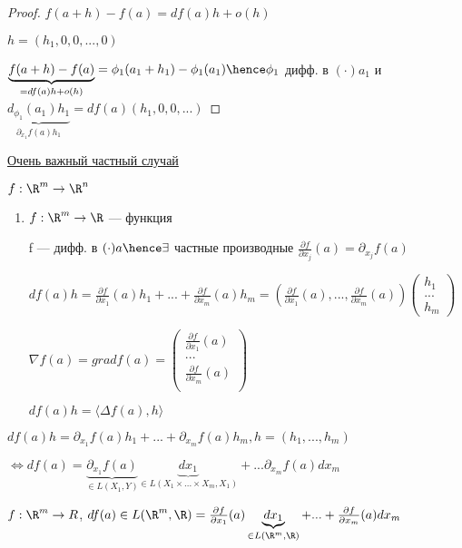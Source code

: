 \begin{proof}
    $f(a + h) - f(a) = df(a)h + o(h)$ 

    $h = (h_1, 0, 0, ..., 0)$

    $\underbrace{f(a + h) - f(a)}_{ = df(a)h + o(h)} = \phi_1(a_1 + h_1) - \phi_1(a_1) \hence \phi_1$ дифф. в $(\cdot) a_1$ и 
    $\underbrace{d_{\phi_1}(a_1)h_1}_{\partial_{x_1} f(a)h_1} = df(a)(h_1, 0, 0, ...)$  
\end{proof}

\underline{Очень важный частный случай}

$f : \R ^ m \to \R^n$

\begin{enumerate}
    

    \item $f : \R ^ m \to \R$ --- функция
    
    f --- дифф. в $(\cdot)a \hence \exists $ частные производные $\frac{\partial f}{\partial {x_j}}(a) = \partial _{x_j}f(a)$

    $df(a)h = \frac{\partial f}{\partial x_1}(a)h_1 + ... + \frac{\partial f}{\partial x_m}(a)h_m = \left( \frac{\partial f}{\partial x_1}(a), ... , \frac{\partial f}{\partial x_m}(a)\right) \begin{pmatrix}
        h_1\\
        ...\\
        h_m
    \end{pmatrix}$

    \begin{definition}
        $ \nabla f(a) = grad f(a) = \begin{pmatrix}
            \frac{\partial f}{\partial x_1}(a)\\
            ...\\
            \frac{\partial f}{\partial x_m}(a)\\
        \end{pmatrix}$

        $df(a)h = \langle \Delta f(a), h \rangle$
    \end{definition}
\end{enumerate}


\begin{remark}
    $df(a)h = \partial_{x_1}f(a)h_1 + ... + \partial_{x_m}f(a)h_m, h = (h_1, ..., h_m)$ 
    
    $\Longleftrightarrow df(a) = \underbrace{\partial_{x_1}f(a)}_{\in L(X_1, Y)} \underbrace{dx_1}_{\in L(X_1 \times ... \times X_m, X_1)} + ... \partial_{x_m}f(a)dx_m$
    
    $f : \R^ m \to R$, $df(a) \in L(\R ^ m, \R) = \frac{\partial f}{\partial x_1}(a) \underbrace{dx_1}_{\in L(\R^m, \R)} + ... + \frac{\partial f}{\partial x_m}(a) dx_m$
\end{remark}

